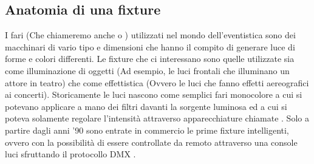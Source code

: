\documentclass[main.tex]{subfiles}
\begin{document}
\subsection{Anatomia di una fixture}\label{subsec:1_fixtureAnatomy}
I fari (Che chiameremo anche  o ) utilizzati nel mondo dell'eventistica sono dei macchinari di vario tipo e dimensioni che hanno il compito di generare luce di forme e colori differenti. Le fixture che ci interessano sono quelle utilizzate sia come illuminazione di oggetti (Ad esempio, le luci frontali che illuminano un attore in teatro) che come effettistica (Ovvero le luci che fanno effetti aereografici ai concerti). Storicamente le luci nascono come semplici fari monocolore a cui si potevano applicare a mano dei filtri davanti la sorgente luminosa ed a cui si poteva solamente regolare l'intensità attraverso apparecchiature chiamate . Solo a partire dagli anni '90 sono entrate in commercio le prime fixture intelligenti, ovvero con la possibilità di essere controllate da remoto attraverso una console luci sfruttando il protocollo DMX \cite{DMX}. 
\end{document}
